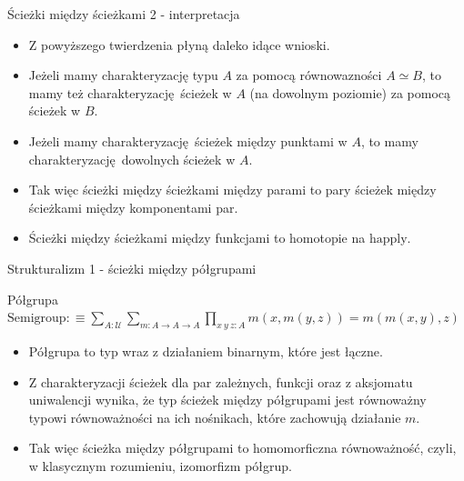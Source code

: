 \documentclass{beamer}
\newcommand{\defn}{:\equiv}
\newcommand{\U}{\mathcal{U}}
\newcommand{\happly}{\text{happly}}
\begin{document}
\begin{frame}{Ścieżki między ścieżkami 2 - interpretacja}
\begin{itemize}
	\item Z powyższego twierdzenia płyną daleko idące wnioski.
	\item Jeżeli mamy charakteryzację typu $A$ za pomocą równowazności $A \simeq B$, to mamy też charakteryzację ścieżek w $A$ (na dowolnym poziomie) za pomocą ścieżek w $B$.
	\item Jeżeli mamy charakteryzację ścieżek między punktami w $A$, to mamy charakteryzację dowolnych ścieżek w $A$.
	\item Tak więc ścieżki między ścieżkami między parami to pary ścieżek między ścieżkami między komponentami par.
	\item Ścieżki między ścieżkami między funkcjami to homotopie na $\happly$.
\end{itemize}
\end{frame}

\begin{frame}{Strukturalizm 1 - ścieżki między półgrupami}

\begin{block}{Półgrupa}
$\displaystyle \text{Semigroup} \defn \sum_{A : \U} \sum_{m : A \to A \to A} \prod_{x\ y\ z : A} m(x, m(y, z)) = m(m(x, y), z)$
\end{block}

\begin{itemize}
	\item Półgrupa to typ wraz z działaniem binarnym, które jest łączne.
	\item Z charakteryzacji ścieżek dla par zależnych, funkcji oraz z aksjomatu uniwalencji wynika, że typ ścieżek między półgrupami jest równoważny typowi równoważności na ich nośnikach, które zachowują działanie $m$.
	\item Tak więc ścieżka między półgrupami to homomorficzna równoważność, czyli, w klasycznym rozumieniu, izomorfizm półgrup.
\end{itemize}

\end{frame}
\end{document}
